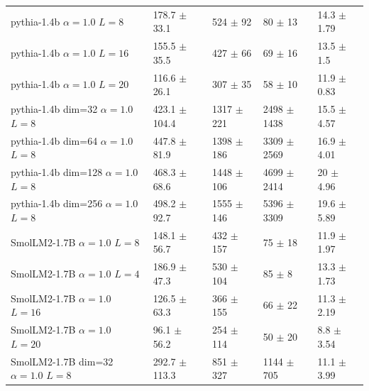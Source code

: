 \begin{tabular}{lllll}
 pythia-1.4b {\small $\alpha=1.0$} {\small $L=8$}                    & 178.7 {\small $\pm$ 33.1}   & 524 {\small $\pm$ 92}    & 80 {\small $\pm$ 13}      & 14.3 {\small $\pm$ 1.79} \\
 pythia-1.4b {\small $\alpha=1.0$} {\small $L=16$}                   & 155.5 {\small $\pm$ 35.5}   & 427 {\small $\pm$ 66}    & 69 {\small $\pm$ 16}      & 13.5 {\small $\pm$ 1.5}  \\
 pythia-1.4b {\small $\alpha=1.0$} {\small $L=20$}                   & 116.6 {\small $\pm$ 26.1}   & 307 {\small $\pm$ 35}    & 58 {\small $\pm$ 10}      & 11.9 {\small $\pm$ 0.83} \\
 pythia-1.4b {\small dim=32} {\small $\alpha=1.0$} {\small $L=8$}    & 423.1 {\small $\pm$ 104.4}  & 1317 {\small $\pm$ 221}  & 2498 {\small $\pm$ 1438}  & 15.5 {\small $\pm$ 4.57} \\
 pythia-1.4b {\small dim=64} {\small $\alpha=1.0$} {\small $L=8$}    & 447.8 {\small $\pm$ 81.9}   & 1398 {\small $\pm$ 186}  & 3309 {\small $\pm$ 2569}  & 16.9 {\small $\pm$ 4.01} \\
 pythia-1.4b {\small dim=128} {\small $\alpha=1.0$} {\small $L=8$}   & 468.3 {\small $\pm$ 68.6}   & 1448 {\small $\pm$ 106}  & 4699 {\small $\pm$ 2414}  & 20 {\small $\pm$ 4.96}   \\
 pythia-1.4b {\small dim=256} {\small $\alpha=1.0$} {\small $L=8$}   & 498.2 {\small $\pm$ 92.7}   & 1555 {\small $\pm$ 146}  & 5396 {\small $\pm$ 3309}  & 19.6 {\small $\pm$ 5.89} \\
 \midrule
 SmolLM2-1.7B {\small $\alpha=1.0$} {\small $L=8$}                   & 148.1 {\small $\pm$ 56.7}   & 432 {\small $\pm$ 157}   & 75 {\small $\pm$ 18}      & 11.9 {\small $\pm$ 1.97} \\
 SmolLM2-1.7B {\small $\alpha=1.0$} {\small $L=4$}                   & 186.9 {\small $\pm$ 47.3}   & 530 {\small $\pm$ 104}   & 85 {\small $\pm$ 8}       & 13.3 {\small $\pm$ 1.73} \\
 SmolLM2-1.7B {\small $\alpha=1.0$} {\small $L=16$}                  & 126.5 {\small $\pm$ 63.3}   & 366 {\small $\pm$ 155}   & 66 {\small $\pm$ 22}      & 11.3 {\small $\pm$ 2.19} \\
 SmolLM2-1.7B {\small $\alpha=1.0$} {\small $L=20$}                  & 96.1 {\small $\pm$ 56.2}    & 254 {\small $\pm$ 114}   & 50 {\small $\pm$ 20}      & 8.8 {\small $\pm$ 3.54}  \\
 SmolLM2-1.7B {\small dim=32} {\small $\alpha=1.0$} {\small $L=8$}   & 292.7 {\small $\pm$ 113.3}  & 851 {\small $\pm$ 327}   & 1144 {\small $\pm$ 705}   & 11.1 {\small $\pm$ 3.99} \\

\end{tabular}
